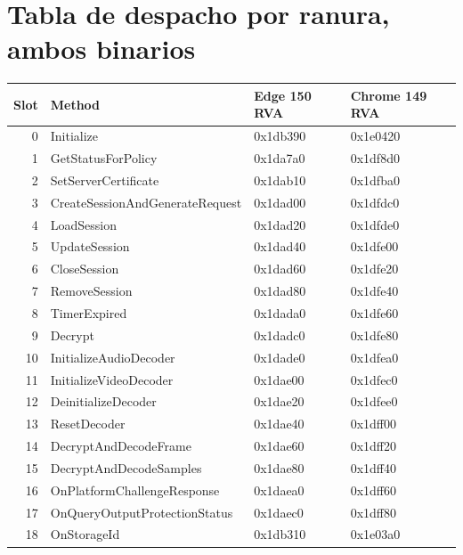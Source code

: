 \documentclass[11pt,letterpaper]{article}
\let\oldsection\section
\renewcommand{\section}{\clearpage\oldsection}
\begin{document}
\appendix

\section{Tabla de despacho por ranura, ambos binarios}
\label{app:slot-table}

\begin{center}\footnotesize
\begin{tabular}{rlll}
\toprule
\textbf{Slot} & \textbf{Method} & \textbf{Edge 150 RVA} & \textbf{Chrome 149 RVA} \\
\midrule
0  & Initialize                       & 0x1db390 & 0x1e0420 \\
1  & GetStatusForPolicy                & 0x1da7a0 & 0x1df8d0 \\
2  & SetServerCertificate              & 0x1dab10 & 0x1dfba0 \\
3  & CreateSessionAndGenerateRequest   & 0x1dad00 & 0x1dfdc0 \\
4  & LoadSession                       & 0x1dad20 & 0x1dfde0 \\
5  & UpdateSession                     & 0x1dad40 & 0x1dfe00 \\
6  & CloseSession                      & 0x1dad60 & 0x1dfe20 \\
7  & RemoveSession                     & 0x1dad80 & 0x1dfe40 \\
8  & TimerExpired                      & 0x1dada0 & 0x1dfe60 \\
9  & Decrypt                           & 0x1dadc0 & 0x1dfe80 \\
10 & InitializeAudioDecoder            & 0x1dade0 & 0x1dfea0 \\
11 & InitializeVideoDecoder            & 0x1dae00 & 0x1dfec0 \\
12 & DeinitializeDecoder               & 0x1dae20 & 0x1dfee0 \\
13 & ResetDecoder                      & 0x1dae40 & 0x1dff00 \\
14 & DecryptAndDecodeFrame             & 0x1dae60 & 0x1dff20 \\
15 & DecryptAndDecodeSamples           & 0x1dae80 & 0x1dff40 \\
16 & OnPlatformChallengeResponse       & 0x1daea0 & 0x1dff60 \\
17 & OnQueryOutputProtectionStatus     & 0x1daec0 & 0x1dff80 \\
18 & OnStorageId                       & 0x1db310 & 0x1e03a0 \\
\bottomrule
\end{tabular}
\end{center}
\end{document}

